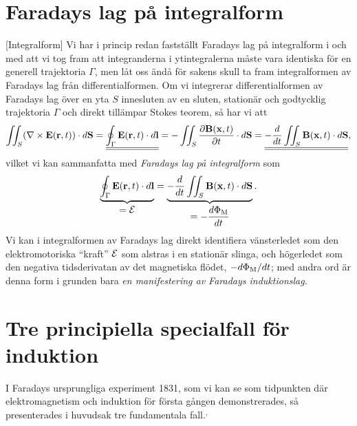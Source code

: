 {{{{\section{Faradays lag p{\aa} integralform}
[Integralform]
Vi har i princip redan fastst{\"a}llt Faradays lag p{\aa} integralform i och
med att vi tog fram att inte\-grand\-erna i ytintegralerna m{\aa}ste vara
identiska f{\"o}r en generell trajektoria $\Gamma$, men l{\aa}t oss
{\"a}nd{\aa} f{\"o}r sakens skull ta fram integralformen av Faradays lag
fr{\aa}n differentialformen.
Om vi integrerar differentialformen av Faradays lag {\"o}ver en yta $S$
innesluten av en sluten, station{\"a}r och godtycklig trajektoria $\Gamma$
och direkt till{\"a}mpar Stokes teorem, s{\aa} har vi att
$$
  \iint_S(\nabla\times{\bf E}({\bf r},t))\cdot d{\bf S}
  =\underline{\underline{
     \oint_{\Gamma}{\bf E}({\bf r},t)\cdot d{\bf l}
   }}
  =-\iint_S{{\partial{\bf B}({\bf x},t)}\over{\partial t}}\cdot d{\bf S}
  =\underline{\underline{
     -{{d}\over{dt}}\iint_S{\bf B}({\bf x},t)\cdot d{\bf S}
   }},
$$
vilket vi kan sammanfatta med {\it Faradays lag p{\aa} integralform} som
$$
  \underbrace{
    \oint_{\Gamma}{\bf E}({\bf r},t)\cdot d{\bf l}
  }_{\displaystyle ={\cal E}}
    =\underbrace{
       -{{d}\over{dt}}\iint_S{\bf B}({\bf x},t)\cdot d{\bf S}
     }_{\displaystyle =-{{d\Phi_{\rm M}}\over{dt}}}.
$$
Vi kan i integralformen av Faradays lag direkt identifiera v{\"a}nsterledet som
den elektromotoriska ``kraft'' ${\cal E}$ som alstras i en station{\"a}r slinga,
och h{\"o}gerledet som den negativa tidsderivatan av det magnetiska fl{\"o}det,
$-d\Phi_{\rm M}/dt$; med andra ord {\"a}r denna form i grunden bara
{\it en manifestering av Faradays induktionslag}.

\section{Tre principiella specialfall f{\"o}r induktion}
I Faradays ursprungliga experiment 1831, som vi kan se som tidpunkten d{\"a}r
elektromagnetism och induktion f{\"o}r f{\"o}rsta g{\aa}ngen demonstrerades,
s{\aa} presenterades i huvudsak tre fundamentala
fall.${^{,}}$%

}}}}
